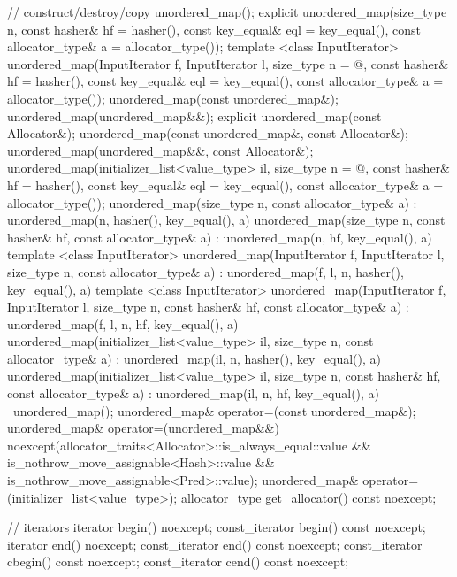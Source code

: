 \begin{codeblock}
{{    // construct/destroy/copy
    unordered_map();
    explicit unordered_map(size_type n,
                           const hasher& hf = hasher(),
                           const key_equal& eql = key_equal(),
                           const allocator_type& a = allocator_type());
    template <class InputIterator>
      unordered_map(InputIterator f, InputIterator l,
                    size_type n = @\seebelow@,
                    const hasher& hf = hasher(),
                    const key_equal& eql = key_equal(),
                    const allocator_type& a = allocator_type());
    unordered_map(const unordered_map&);
    unordered_map(unordered_map&&);
    explicit unordered_map(const Allocator&);
    unordered_map(const unordered_map&, const Allocator&);
    unordered_map(unordered_map&&, const Allocator&);
    unordered_map(initializer_list<value_type> il,
                  size_type n = @\seebelow@,
                  const hasher& hf = hasher(),
                  const key_equal& eql = key_equal(),
                  const allocator_type& a = allocator_type());
    unordered_map(size_type n, const allocator_type& a)
      : unordered_map(n, hasher(), key_equal(), a) { }
    unordered_map(size_type n, const hasher& hf, const allocator_type& a)
      : unordered_map(n, hf, key_equal(), a) { }
    template <class InputIterator>
      unordered_map(InputIterator f, InputIterator l, size_type n, const allocator_type& a)
        : unordered_map(f, l, n, hasher(), key_equal(), a) { }
    template <class InputIterator>
      unordered_map(InputIterator f, InputIterator l, size_type n, const hasher& hf,
                    const allocator_type& a)
        : unordered_map(f, l, n, hf, key_equal(), a) { }
    unordered_map(initializer_list<value_type> il, size_type n, const allocator_type& a)
      : unordered_map(il, n, hasher(), key_equal(), a) { }
    unordered_map(initializer_list<value_type> il, size_type n, const hasher& hf,
                  const allocator_type& a)
      : unordered_map(il, n, hf, key_equal(), a) { }
    ~unordered_map();
    unordered_map& operator=(const unordered_map&);
    unordered_map& operator=(unordered_map&&)
      noexcept(allocator_traits<Allocator>::is_always_equal::value &&
               is_nothrow_move_assignable<Hash>::value &&
               is_nothrow_move_assignable<Pred>::value);
    unordered_map& operator=(initializer_list<value_type>);
    allocator_type get_allocator() const noexcept;

    // iterators
    iterator       begin() noexcept;
    const_iterator begin() const noexcept;
    iterator       end() noexcept;
    const_iterator end() const noexcept;
    const_iterator cbegin() const noexcept;
    const_iterator cend() const noexcept;

}}
\end{codeblock}
